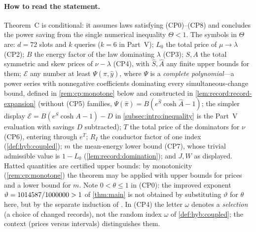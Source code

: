 \paragraph{How to read the statement.}
Theorem~C is conditional: it assumes laws satisfying (CP0)--(CP8)
and concludes the power saving from the single numerical inequality
$\Theta<1$. The symbols in $\Theta$ are: $d=72$ slots and $k$ queries
($k=6$ in Part~V); $L_0$ the total price of $\mu\to\lambda$ (CP2);
$B$ the energy factor of the law dominating $\lambda$ (CP3);
$S,A$ the total symmetric and skew prices of $\nu-\lambda$ (CP4),
with $\hat S,\hat A$ any finite upper bounds for them; $\mathcal E$
any number at least $\Psi(\hat\pi,\hat y)$, where $\Psi$ is a
\emph{complete polynomial}---a power series with nonnegative
coefficients dominating every simultaneous-change bound, defined in
\cref{rem:cp:monotone} below and constructed in
\cref{lem:record:record-expansion} (without (CP5) families,
$\Psi(\hat\pi)=B(e^{\hat S}\cosh\hat A-1)$; the simpler display
$\mathcal E=B(e^S\cosh A-1)-D$ in \cref{subsec:intro:inequality} is
the Part~V evaluation with savings $D$ subtracted); $T$ the total
price of the dominators for $\nu$ (CP6), entering through $e^T$;
$R_I$ the conductor factor of one index (\cref{def:hyb:coupled});
$m$ the mean-energy lower bound (CP7), whose trivial admissible
value is $1-L_0$ (\cref{lem:record:domination}); and
$J,W$ as displayed. Hatted quantities are certified upper bounds:
by monotonicity (\cref{rem:cp:monotone}) the theorem may be applied
with upper bounds for prices and a lower bound for $m$. Note
$0<\theta\le1$ in (CP0): the improved exponent
$\vartheta=1014587/1000000>1$ of \cref{thm:main} is not obtained
by substituting $\vartheta$ for $\theta$ here, but by the separate
induction of .
In (CP4) the letter $\omega$ denotes a \emph{selection} (a choice of
changed records), not the random index $\omega$ of
\cref{def:hyb:coupled}; the context (prices versus intervals)
distinguishes them.

